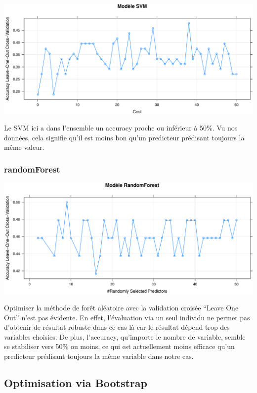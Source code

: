 \documentclass[]{article}
\begin{document}
\includegraphics{repport_projet_files/figure-latex/unnamed-chunk-51-1.pdf}

Le SVM ici a dans l'ensemble un accuracy proche ou inférieur à 50\%. Vu
nos données, cela signifie qu'il est moins bon qu'un predicteur
prédisant toujours la même valeur.

\hypertarget{randomforest}{%
\subsubsection{randomForest}\label{randomforest}}

\includegraphics{repport_projet_files/figure-latex/unnamed-chunk-52-1.pdf}

Optimiser la méthode de forêt aléatoire avec la validation croisée
``Leave One Out'' n'est pas évidente. En effet, l'évaluation via un seul
individu ne permet pas d'obtenir de résultat robuste dans ce cas là car
le résultat dépend trop des variables choisies. De plus, l'accuracy,
qu'importe le nombre de variable, semble se stabiliser vers 50\% ou
moins, ce qui est actuellement moins efficace qu'un predicteur prédisant
toujours la même variable dans notre cas.

\hypertarget{optimisation-via-bootstrap}{%
\subsection{Optimisation via
Bootstrap}\label{optimisation-via-bootstrap}}
\end{document}

